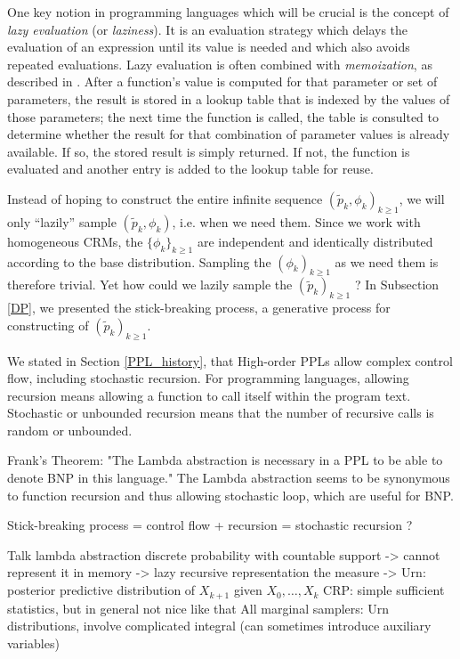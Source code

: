 One key notion in programming languages which will be crucial is the concept of \textit{lazy evaluation} (or \textit{laziness}). It is an evaluation strategy which delays the evaluation of an expression until its value is needed and which also avoids repeated evaluations.
Lazy evaluation is often combined with \textit{memoization}, as described in \cite{Bentley:1982:WEP:539147}. After a function's value is computed for that parameter or set of parameters, the result is stored in a lookup table that is indexed by the values of those parameters; the next time the function is called, the table is consulted to determine whether the result for that combination of parameter values is already available. If so, the stored result is simply returned. If not, the function is evaluated and another entry is added to the lookup table for reuse.

Instead of hoping to construct the entire infinite sequence $\left(\tilde{p}_k, \phi_k \right)_{k \ge 1}$, we will only ``lazily'' sample $\left(\tilde{p}_k, \phi_k \right)$, i.e. when we need them.
Since we work with homogeneous \glspl{CRM}, the $\{\phi_k\}_{k \ge 1}$ are independent and identically distributed according to the base distribution. Sampling the $(\phi_k)_{k \ge 1}$ as we need them is therefore trivial. Yet how could we lazily sample the $(\tilde{p}_k)_{k \ge 1}$ ?
In Subsection \ref{DP}, we presented the stick-breaking process, a generative process for constructing of $(\tilde{p}_k)_{k \ge 1}$.


We stated in Section \ref{PPL_history}, that High-order \glspl{PPL} allow complex control flow, including stochastic recursion. For programming languages, allowing recursion means allowing a function to call itself within the program text. Stochastic or unbounded recursion means that the number of recursive calls is random or unbounded.





Frank's Theorem: "The Lambda abstraction is necessary in a PPL to be able to denote BNP in this language." The Lambda abstraction seems to be synonymous to function recursion and thus allowing stochastic loop, which are useful for BNP.

Stick-breaking process = control flow + recursion = stochastic recursion ?

Talk lambda abstraction
discrete probability with countable support -> cannot represent it in memory
-> lazy recursive representation the measure
-> Urn: posterior predictive distribution of $X_{k+1}$ given $X_0, \dots, X_{k}$
CRP: simple sufficient statistics, but in general not nice like that
All marginal samplers: Urn distributions, involve complicated integral (can sometimes introduce auxiliary variables)

